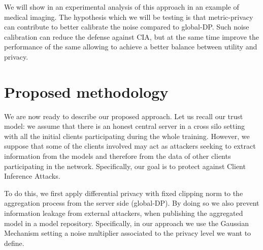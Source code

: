 \documentclass[5p,times]{elsarticle}
\begin{document}
We will show in  an experimental analysis of this approach in an example of medical imaging. The hypothesis which we will be testing is that metric-privacy can contribute to better calibrate the noise compared to global-DP. Such noise calibration can reduce the defense against CIA, but at the same time improve the performance of the same allowing to achieve a better balance between utility and privacy.







\section{Proposed methodology}\label{sec:methodology}

We are now ready to describe our proposed approach. Let us recall our trust model:
we assume that there is an honest central server  in a cross silo setting with all the initial clients participating during the whole training. However, we suppose that some of the clients involved may act as attackers seeking to extract information from the models and therefore from the data of other clients participating in the network. Specifically, our goal is to protect against Client Inference Attacks.

To do this, we first apply differential privacy with fixed clipping norm to the aggregation process from the server side (global-DP). By doing so we also prevent information leakage from external attackers, when publishing the aggregated model in a model repository. %
Specifically, in our approach we use the Gaussian Mechanism setting a noise multiplier associated to the privacy level we want to define.
\end{document}
